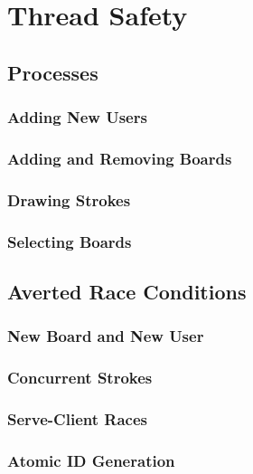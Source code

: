 \section{Thread Safety}

\subsection{Processes}

\subsubsection{Adding New Users}

\subsubsection{Adding and Removing Boards}

\subsubsection{Drawing Strokes}

\subsubsection{Selecting Boards}


\subsection{Averted Race Conditions}

\subsubsection{New Board and New User}

\subsubsection{Concurrent Strokes}

\subsubsection{Serve-Client Races}

\subsubsection{Atomic ID Generation}